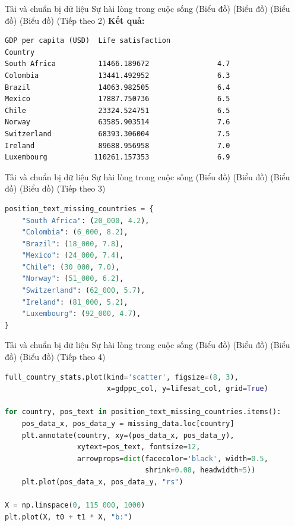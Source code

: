 \documentclass[aspectratio=169]{beamer}
\begin{document}
\begin{frame}[fragile]{Tải và chuẩn bị dữ liệu Sự hài lòng trong cuộc sống (Biểu đồ) (Biểu đồ) (Biểu đồ) (Biểu đồ) (Tiếp theo 2)}
\textbf{Kết quả:}
\begin{verbatim}
GDP per capita (USD)  Life satisfaction
Country                                              
South Africa          11466.189672                4.7
Colombia              13441.492952                6.3
Brazil                14063.982505                6.4
Mexico                17887.750736                6.5
Chile                 23324.524751                6.5
Norway                63585.903514                7.6
Switzerland           68393.306004                7.5
Ireland               89688.956958                7.0
Luxembourg           110261.157353                6.9
\end{verbatim}


\end{frame}

\begin{frame}[fragile]{Tải và chuẩn bị dữ liệu Sự hài lòng trong cuộc sống (Biểu đồ) (Biểu đồ) (Biểu đồ) (Biểu đồ) (Tiếp theo 3)}
\begin{lstlisting}[language=Python]
position_text_missing_countries = {
    "South Africa": (20_000, 4.2),
    "Colombia": (6_000, 8.2),
    "Brazil": (18_000, 7.8),
    "Mexico": (24_000, 7.4),
    "Chile": (30_000, 7.0),
    "Norway": (51_000, 6.2),
    "Switzerland": (62_000, 5.7),
    "Ireland": (81_000, 5.2),
    "Luxembourg": (92_000, 4.7),
}
\end{lstlisting}


\end{frame}

\begin{frame}[fragile]{Tải và chuẩn bị dữ liệu Sự hài lòng trong cuộc sống (Biểu đồ) (Biểu đồ) (Biểu đồ) (Biểu đồ) (Tiếp theo 4)}
\begin{lstlisting}[language=Python]
full_country_stats.plot(kind='scatter', figsize=(8, 3),
                        x=gdppc_col, y=lifesat_col, grid=True)

for country, pos_text in position_text_missing_countries.items():
    pos_data_x, pos_data_y = missing_data.loc[country]
    plt.annotate(country, xy=(pos_data_x, pos_data_y),
                 xytext=pos_text, fontsize=12,
                 arrowprops=dict(facecolor='black', width=0.5,
                                 shrink=0.08, headwidth=5))
    plt.plot(pos_data_x, pos_data_y, "rs")

X = np.linspace(0, 115_000, 1000)
plt.plot(X, t0 + t1 * X, "b:")

\end{lstlisting}


\end{frame}
\end{document}
